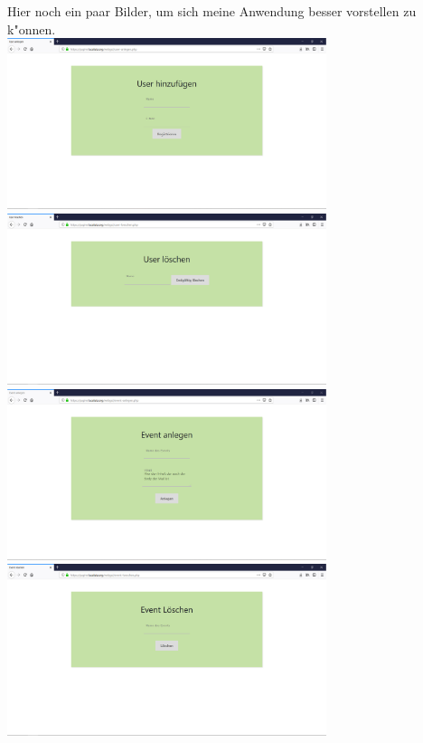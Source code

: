 \documentclass[12pt,twoside]{article}  %
\begin{document}
 

  Hier noch ein paar Bilder, um sich meine Anwendung besser vorstellen zu k"onnen. \\
    \includegraphics[width=0.7\textwidth]{user-anlegen.jpg} \\
    \includegraphics[width=0.7\textwidth]{user-loeschen.jpg} \\
    \includegraphics[width=0.7\textwidth]{event-anlegen.jpg} \\
    \includegraphics[width=0.7\textwidth]{event-loeschen.jpg} \\
\end{document}
